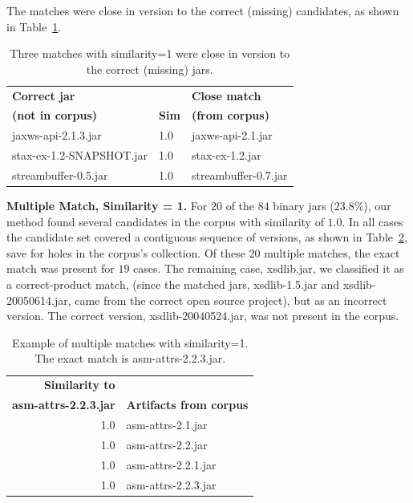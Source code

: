 The matches were close in version
to the correct (missing) candidates,  as shown in Table~\ref{tab:close}.


\begin{table}[htbp]
  \centering
  \begin{tabular}{lll}
    \textbf{Correct jar}      &                & \textbf{Close match} \\
    \textbf{(not in corpus)}  & \textbf{Sim}  & \textbf{(from corpus)} \\
\hline\hline
                      jaxws-api-2.1.3.jar & 1.0 & jaxws-api-2.1.jar       \\
                 stax-ex-1.2-SNAPSHOT.jar & 1.0 & stax-ex-1.2.jar         \\
                     streambuffer-0.5.jar & 1.0 & streambuffer-0.7.jar    \\
\hline
  \end{tabular}
  \vspace{1mm}
  \caption{Three matches with similarity=1 were close in version to the correct (missing) jars.}
  \label{tab:close}
\end{table}




\textbf{Multiple Match, Similarity = 1.}
For $20$ of the $84$ binary jars ($23.8\%$), our method found several candidates
in the corpus with similarity of $1.0$.  In all cases the candidate set
covered a contiguous sequence of versions,
as shown in Table~\ref{tab:contiguous}, save for holes in the corpus's
collection.  Of these $20$ multiple matches, the exact match was present
for $19$ cases.  The remaining case, xsdlib.jar, we classified it as a correct-product match,
(since the matched jars, xsdlib-1.5.jar and xsdlib-20050614.jar, came from
the correct open source project), but as an incorrect version.  
The correct version, xsdlib-20040524.jar, was not present in
the corpus.


\begin{table}[htbp]
  \centering
  \begin{tabular}{rl}
    \textbf{Similarity to}  & \\
    \textbf{asm-attrs-2.2.3.jar}  &  \textbf{Artifacts from corpus}\\
\hline\hline
                 1.0 & asm-attrs-2.1.jar    \\
                 1.0 & asm-attrs-2.2.jar    \\
                 1.0 & asm-attrs-2.2.1.jar  \\
                 1.0 & asm-attrs-2.2.3.jar  \\
\hline
  \end{tabular}
  \vspace{1mm}
  \caption{Example of multiple matches with similarity=1.  The
    exact match is asm-attrs-2.2.3.jar.}
  \label{tab:contiguous}
\end{table}



